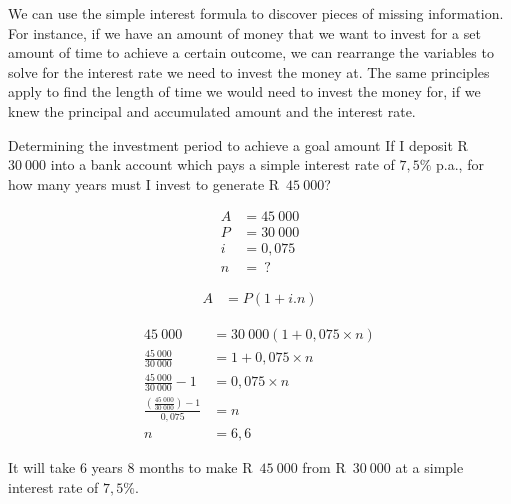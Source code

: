We can use the simple interest formula to discover pieces of missing information. For instance, if we have an amount of money that we want to invest for a set amount of time to achieve a certain outcome, we can rearrange the variables to solve for the interest rate we need to invest the money at. The same principles apply to find the length of time we would need to invest the money for, if we knew the principal and accumulated amount and the interest rate.


\begin{wex}{Determining the investment period to achieve a goal amount}{
    If I deposit R~$30~000$ into a bank account which pays a simple interest rate of $7,5\%$ p.a., for how many years must I invest to generate R~$45~000$?}{

    \begin{align*}
	A &= 45~000\\
	P &= 30~000\\
	i &= 0,075\\
	n &= ~?
    \end{align*}

    \begin{align*}
	A &= P(1 + i . n)
    \end{align*}

    \begin{align*}
	45~000 &= 30~000(1 + 0,075 \times n)\\
	\frac{45~000}{30~000} &= 1 + 0,075 \times n \\[5pt]
	\frac{45~000}{30~000} -1 &= 0,075 \times n\\[5pt]
	\frac{(\frac{45~000}{30~000}) -1}{0,075} &= n\\
	n &= 6,6
    \end{align*}

    It will take 6 years 8 months to make R~$45~000$ from R~$30~000$ at a simple interest rate of $7,5\%$.
    }
\end{wex}




